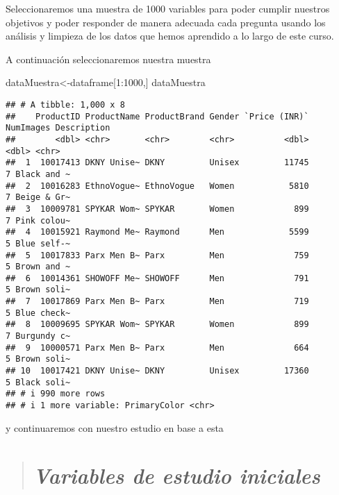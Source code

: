 \documentclass[
]{article}
\newenvironment{Shaded}{\begin{snugshade}}{\end{snugshade}}
\newcommand{\DecValTok}[1]{\textcolor[rgb]{0.00,0.00,0.81}{#1}}
\newcommand{\NormalTok}[1]{#1}
\newcommand{\OtherTok}[1]{\textcolor[rgb]{0.56,0.35,0.01}{#1}}
\newcommand{\SpecialCharTok}[1]{\textcolor[rgb]{0.00,0.00,0.00}{#1}}
\begin{document}
Seleccionaremos una muestra de 1000 variables para poder cumplir
nuestros objetivos y poder responder de manera adecuada cada pregunta
usando los análisis y limpieza de los datos que hemos aprendido a lo
largo de este curso.

A continuación seleccionaremos nuestra muestra

\begin{Shaded}
\begin{Highlighting}[]
\NormalTok{dataMuestra}\OtherTok{\textless{}{-}}\NormalTok{dataframe[}\DecValTok{1}\SpecialCharTok{:}\DecValTok{1000}\NormalTok{,]}
\NormalTok{dataMuestra}
\end{Highlighting}
\end{Shaded}

\begin{verbatim}
## # A tibble: 1,000 x 8
##    ProductID ProductName ProductBrand Gender `Price (INR)` NumImages Description
##        <dbl> <chr>       <chr>        <chr>          <dbl>     <dbl> <chr>      
##  1  10017413 DKNY Unise~ DKNY         Unisex         11745         7 Black and ~
##  2  10016283 EthnoVogue~ EthnoVogue   Women           5810         7 Beige & Gr~
##  3  10009781 SPYKAR Wom~ SPYKAR       Women            899         7 Pink colou~
##  4  10015921 Raymond Me~ Raymond      Men             5599         5 Blue self-~
##  5  10017833 Parx Men B~ Parx         Men              759         5 Brown and ~
##  6  10014361 SHOWOFF Me~ SHOWOFF      Men              791         5 Brown soli~
##  7  10017869 Parx Men B~ Parx         Men              719         5 Blue check~
##  8  10009695 SPYKAR Wom~ SPYKAR       Women            899         7 Burgundy c~
##  9  10000571 Parx Men B~ Parx         Men              664         5 Brown soli~
## 10  10017421 DKNY Unise~ DKNY         Unisex         17360         5 Black soli~
## # i 990 more rows
## # i 1 more variable: PrimaryColor <chr>
\end{verbatim}

y continuaremos con nuestro estudio en base a esta

\begin{quote}
\hypertarget{variables-de-estudio-iniciales}{%
\section{\texorpdfstring{\textbf{\emph{Variables de estudio
iniciales}}}{Variables de estudio iniciales}}\label{variables-de-estudio-iniciales}}
\end{quote}
\end{document}
